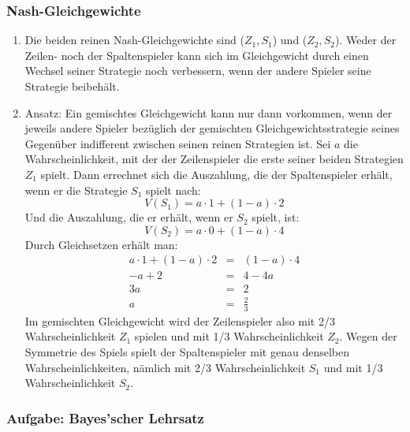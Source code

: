 \subsubsection*{Nash-Gleichgewichte}

\begin{enumerate}
\item Die beiden reinen Nash-Gleichgewichte sind ($Z_1,S_1$) und
  ($Z_2,S_2$). Weder der Zeilen- noch der Spaltenspieler kann sich im
  Gleichgewicht durch einen Wechsel seiner Strategie noch verbessern,
  wenn der andere Spieler seine Strategie beibehält.

\item Ansatz: Ein gemischtes Gleichgewicht kann nur dann vorkommen,
  wenn der jeweils andere Spieler bezüglich der gemischten
  Gleichgewichtsstrategie seines Gegenüber indifferent zwischen seinen
  reinen Strategien ist. Sei $a$ die Wahrscheinlichkeit, mit der der
  Zeilenspieler die erste seiner beiden Strategien $Z_1$ spielt. Dann
  errechnet sich die Auszahlung, die der Spaltenspieler erhält, wenn
  er die Strategie $S_1$ spielt nach:
\[ V(S_1) = a \cdot 1 + (1-a)\cdot 2 \]
  Und die Auszahlung, die er erhält, wenn er $S_2$ spielt, ist:
\[ V(S_2) = a \cdot 0 + (1-a)\cdot 4 \]
  Durch Gleichsetzen erhält man:
\begin{eqnarray}
a \cdot 1 + (1-a)\cdot 2 & = & (1-a)\cdot 4 \\
                  -a + 2 & = & 4 - 4a \\
                      3a & = & 2 \\
                       a & = & \frac{2}{3}
\end{eqnarray}
Im gemischten Gleichgewicht wird der Zeilenspieler also mit 2/3
Wahrscheinlichkeit $Z_1$ spielen und mit 1/3 Wahrscheinlichkeit
$Z_2$. Wegen der Symmetrie des Spiels spielt der Spaltenspieler mit
genau denselben Wahrscheinlichkeiten, nämlich mit 2/3
Wahrscheinlichkeit $S_1$ und mit 1/3 Wahrscheinlichkeit $S_2$.

\end{enumerate}

\subsubsection*{Aufgabe: Bayes'scher Lehrsatz}

